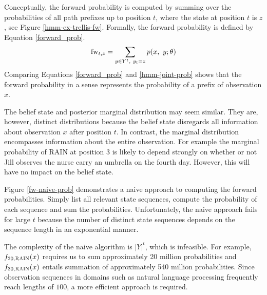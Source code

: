 Conceptually, the forward probability is computed by summing over the
probabilities of all path prefixes up to position $t$, where the state
at position $t$ is $z$, see Figure \ref{hmm-ex-trellis-fw}. Formally,
the forward probability is defined by Equation \eqref{forward_prob}.
\begin{equation}
\fw_{t,z} = \sum_{y\in Y^t,\ y_t = z} p(x,\ y\parcond\theta)\label{forward_prob}
\end{equation}
Comparing Equations \eqref{forward_prob} and \eqref{hmm-joint-prob}
shows that the forward probability in a sense represents the
probability of a prefix of observation $x$.

The belief state and posterior marginal distribution may seem
similar. They are, however, distinct distributions because the belief
state disregards all information about observation $x$ after position
$t$. In contrast, the marginal distribution encompasses information
about the entire observation. For example the marginal probability of
RAIN at position 3 is likely to depend strongly on whether or not Jill
observes the nurse carry an umbrella on the fourth day. However, this
will have no impact on the belief state.

Figure \ref{fw-naive-prob} demonstrates a naive approach to computing
the forward probabilities. Simply list all relevant state sequences,
compute the probability of each sequence and sum the
probabilities. Unfortunately, the naive approach fails for large $t$
because the number of distinct state sequences depends on the sequence
length in an exponential manner.

The complexity of the naive algorithm is $|Y|^t$, which is infeasible.
For example, $f_{20,\textsc{RAIN}}(x)$ requires us to sum
approximately 20 million probabilities and $f_{30,\textsc{RAIN}}(x)$
entails summation of approximately 540 million probabilities. Since
observation sequences in domains such as natural language processing
frequently reach lengths of $100$, a more efficient approach is required.

